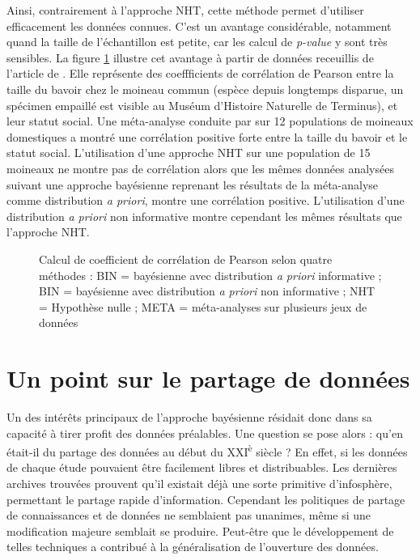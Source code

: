 \documentclass[11pt,twocolumn,twoside]{bopHomework}
\begin{document}
Ainsi, contrairement à l'approche NHT, cette méthode permet d'utiliser
efficacement les données connues.
C'est un avantage considérable, notamment quand la taille de l'échantillon est
petite, car les calcul de \emph{p-value} y sont très sensibles.
La figure \ref{fig:pearson} illustre cet avantage à partir de données receuillis
de l'article de \citet{garamszegi2009}.
Elle représente des coeffficients de corrélation de Pearson entre la taille du
bavoir chez le moineau commun (espèce depuis longtemps disparue, un spécimen
empaillé est visible au Muséum d'Histoire Naturelle de Terminus), et leur statut
social.
Une méta-analyse conduite par \citet{nakagawa2007} sur 12 populations de
moineaux domestiques a montré une corrélation positive forte entre la taille du
bavoir et le statut social.
L'utilisation d'une approche NHT sur une population de 15 moineaux ne montre pas
de corrélation alors que les mêmes données analysées suivant une approche
bayésienne reprenant les résultats de la méta-analyse comme distribution
\emph{a priori}, montre une corrélation positive.
L'utilisation d'une distribution \emph{a priori} non informative montre
cependant les mêmes résultats que l'approche NHT.

\begin{figure}[t]
  {\graphfont\centering}
  \caption{Calcul de coefficient de corrélation de Pearson selon quatre méthodes
    : BIN = bayésienne avec distribution \textit{a priori} informative ;
    BIN = bayésienne avec distribution \textit{a priori} non informative ;
    NHT = Hypothèse nulle ;
    META = méta-analyses sur plusieurs jeux de données
  }
  \label{fig:pearson}
\end{figure}


\section{Un point sur le partage de données}

Un des intérêts principaux de l'approche bayésienne résidait donc dans sa
capacité à tirer profit des données préalables.
Une question se pose alors : qu'en était-il du partage des données au début du
XXI\textsuperscript{è} siècle ?
En effet, si les données de chaque étude pouvaient être facilement libres et
distribuables.
Les dernières archives trouvées prouvent qu'il existait déjà une sorte primitive
d'infosphère, permettant le partage rapide d'information.
Cependant les politiques de partage de connaissances et de données ne semblaient
pas unanimes, même si une modification majeure semblait se produire.
Peut-être que le développement de telles techniques a contribué à la
généralisation de l'ouverture des données.


\begin{scriptsize}
  
\end{scriptsize}
\end{document}
